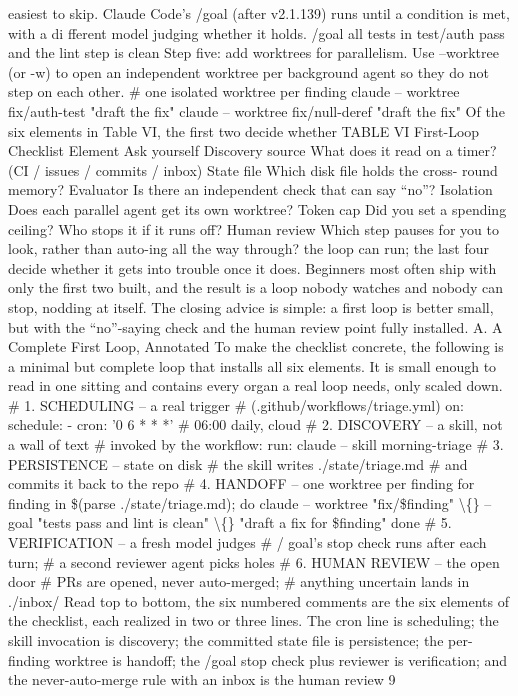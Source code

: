 \documentclass[conference]{IEEEtran}
\begin{document}
easiest to skip. Claude Code’s /goal (after v2.1.139) runs until
a condition is met, with a di fferent model judging whether it
holds.
/goal all tests in test/auth pass and the lint
step is clean
Step five: add worktrees for parallelism. Use --worktree
(or -w) to open an independent worktree per background agent
so they do not step on each other.
\# one isolated worktree per finding
claude -- worktree fix/auth-test "draft the fix"
claude -- worktree fix/null-deref "draft the fix"
Of the six elements in Table VI, the first two decide whether
TABLE VI
First-Loop Checklist
Element Ask yourself
Discovery
source
What does it read on a timer? (CI /
issues / commits / inbox)
State file Which disk file holds the cross-
round memory?
Evaluator Is there an independent check that
can say “no”?
Isolation Does each parallel agent get its own
worktree?
Token cap Did you set a spending ceiling?
Who stops it if it runs off?
Human review Which step pauses for you to look,
rather than auto-ing all the way
through?
the loop can run; the last four decide whether it gets into trouble
once it does. Beginners most often ship with only the first two
built, and the result is a loop nobody watches and nobody can
stop, nodding at itself. The closing advice is simple: a first loop
is better small, but with the “no”-saying check and the human
review point fully installed.
A. A Complete First Loop, Annotated
To make the checklist concrete, the following is a minimal but
complete loop that installs all six elements. It is small enough
to read in one sitting and contains every organ a real loop needs,
only scaled down.
\# 1. SCHEDULING -- a real trigger
\# (.github/workflows/triage.yml)
on:
schedule:
- cron: ’0 6 * * *’ \# 06:00 daily, cloud
\# 2. DISCOVERY -- a skill, not a wall of text
\# invoked by the workflow:
run: claude -- skill morning-triage
\# 3. PERSISTENCE -- state on disk
\# the skill writes ./state/triage.md
\# and commits it back to the repo
\# 4. HANDOFF -- one worktree per finding
for finding in \$(parse ./state/triage.md); do
claude -- worktree "fix/\$finding" \textbackslash\{\}
--goal "tests pass and lint is clean" \textbackslash\{\}
"draft a fix for \$finding"
done
\# 5. VERIFICATION -- a fresh model judges
\# / goal’s stop check runs after each turn;
\# a second reviewer agent picks holes
\# 6. HUMAN REVIEW -- the open door
\# PRs are opened, never auto-merged;
\# anything uncertain lands in ./inbox/
Read top to bottom, the six numbered comments are the six
elements of the checklist, each realized in two or three lines.
The cron line is scheduling; the skill invocation is discovery; the
committed state file is persistence; the per-finding worktree is
handoff; the /goal stop check plus reviewer is verification; and
the never-auto-merge rule with an inbox is the human review
9
\end{document}
